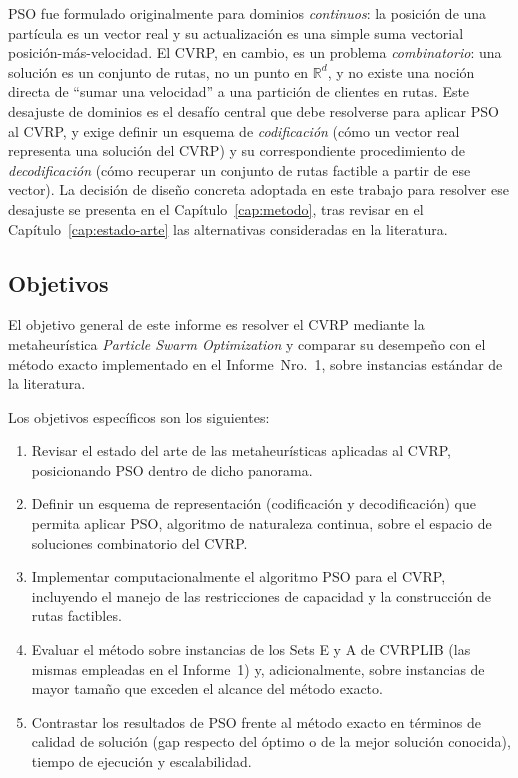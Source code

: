 PSO fue formulado originalmente para dominios \textit{continuos}: la posición de una
partícula es un vector real y su actualización es una simple suma vectorial
posición-más-velocidad. El CVRP, en cambio, es un problema \textit{combinatorio}: una
solución es un conjunto de rutas, no un punto en $\mathbb{R}^d$, y no existe una noción
directa de ``sumar una velocidad'' a una partición de clientes en rutas. Este desajuste
de dominios es el desafío central que debe resolverse para aplicar PSO al CVRP, y exige
definir un esquema de \textit{codificación} (cómo un vector real representa una
solución del CVRP) y su correspondiente procedimiento de \textit{decodificación} (cómo
recuperar un conjunto de rutas factible a partir de ese vector). La decisión de diseño
concreta adoptada en este trabajo para resolver ese desajuste se presenta en el
Capítulo~\ref{cap:metodo}, tras revisar en el Capítulo~\ref{cap:estado-arte} las
alternativas consideradas en la literatura.

\subsection{Objetivos}

El objetivo general de este informe es resolver el CVRP mediante la metaheurística
\textit{Particle Swarm Optimization} y comparar su desempeño con el método exacto
implementado en el Informe~Nro.~1, sobre instancias estándar de la literatura.

Los objetivos específicos son los siguientes:
\begin{enumerate}
    \item Revisar el estado del arte de las metaheurísticas aplicadas al CVRP,
          posicionando PSO dentro de dicho panorama.
    \item Definir un esquema de representación (codificación y decodificación) que
          permita aplicar PSO, algoritmo de naturaleza continua, sobre el espacio de
          soluciones combinatorio del CVRP.
    \item Implementar computacionalmente el algoritmo PSO para el CVRP, incluyendo el
          manejo de las restricciones de capacidad y la construcción de rutas
          factibles.
    \item Evaluar el método sobre instancias de los Sets E y A de CVRPLIB (las mismas
          empleadas en el Informe~1) y, adicionalmente, sobre instancias de mayor
          tamaño que exceden el alcance del método exacto.
    \item Contrastar los resultados de PSO frente al método exacto en términos de
          calidad de solución (gap respecto del óptimo o de la mejor solución
          conocida), tiempo de ejecución y escalabilidad.
\end{enumerate}

